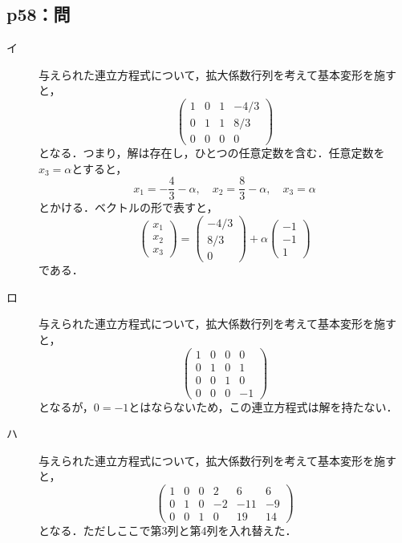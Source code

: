 \documentclass[uplatex,dvipdfmx,a4paper,11pt,fleqn]{jsarticle}
\begin{document}
    \newpage 


    \subsection*{p58：問}

    \begin{tleftbar}
        \begin{description}
            \item[イ] 与えられた連立方程式について，拡大係数行列を考えて基本変形を施すと，
            \[
                \begin{pmatrix} 1 & 0 & 1 & -4/3 \\ 0 & 1 & 1 & 8/3 \\ 0 & 0 & 0 & 0 \end{pmatrix}
            \]
            となる．つまり，解は存在し，ひとつの任意定数を含む．任意定数を$ x_3 =\alpha$とすると，
            \[
                x_1 = -\frac{4}{3} - \alpha,\quad x_2 = \frac{8}{3} - \alpha,\quad x_3 = \alpha
            \]
            とかける．ベクトルの形で表すと，
            \[
                \begin{pmatrix} x_1 \\ x_2 \\ x_3 \end{pmatrix} = \begin{pmatrix} -4/3 \\ 8/3 \\ 0 \end{pmatrix} + \alpha \begin{pmatrix} -1 \\ -1 \\ 1 \end{pmatrix}
            \]
            である．
            \item[ロ] 与えられた連立方程式について，拡大係数行列を考えて基本変形を施すと，
            \[
                \begin{pmatrix} 1 & 0 & 0 & 0 \\ 0 & 1& 0 & 1 \\ 0 & 0 & 1 & 0 \\ 0 & 0 & 0 & -1 \end{pmatrix}
            \]
            となるが，$0 = -1$とはならないため，この連立方程式は解を持たない．
            \item[ハ] 与えられた連立方程式について，拡大係数行列を考えて基本変形を施すと，
            \[
                \begin{pmatrix} 1 & 0 & 0 & 2 & 6 & 6 \\ 0 & 1& 0 & -2 & -11 & -9 \\ 0 & 0 & 1 & 0 & 19 & 14 \end{pmatrix}
            \]
            となる．ただしここで第3列と第4列を入れ替えた．
            

\end{description}
\end{tleftbar}
\end{document}
